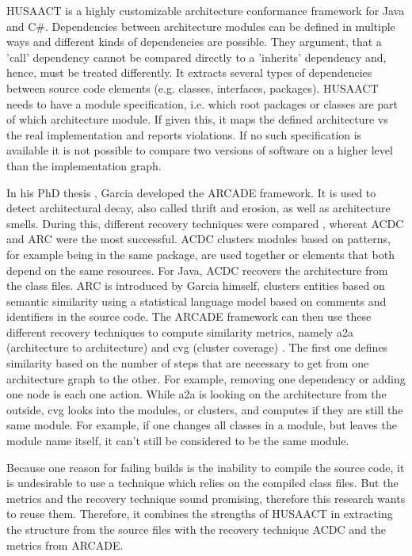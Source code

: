 \documentclass[conference]{IEEEtran}
\begin{document}
HUSAACT \cite{Husacct1,Husacct2} is a highly customizable architecture conformance framework for Java and C\#. Dependencies between architecture modules can be defined in multiple ways and different kinds of dependencies are possible. They argument, that a 'call' dependency cannot be compared directly to a 'inherits' dependency and, hence, must be treated differently. 
It extracts several types of dependencies between source code elements (e.g. classes, interfaces, packages). HUSAACT needs to have a module specification, i.e. which root packages or classes are part of which architecture module. If given this, it maps the defined architecture vs the real implementation and reports violations.
If no such specification is available it is not possible to compare two versions of software on a higher level than the implementation graph. 

In his PhD thesis \cite{arcade-thesis}, Garcia developed the ARCADE framework. It is used to detect architectural decay, also called thrift and erosion, as well as architecture smells. During this, different recovery techniques were compared \cite{arcRec-comparison}, whereat ACDC \cite{ACDC} and ARC were the most successful. 
ACDC clusters modules based on patterns, for example being in the same package, are used together or elements that both depend on the same resources. For Java, ACDC recovers the architecture from the class files. ARC is introduced by Garcia himself, clusters entities based on semantic similarity using a statistical language model based on comments and identifiers in the source code.
The ARCADE framework can then use these different recovery techniques to compute similarity metrics, namely a2a (architecture to architecture) and cvg (cluster coverage) \cite{Arcade}. The first one defines similarity based on the number of steps that are necessary to get from one architecture graph to the other. For example, removing one dependency or adding one node is each one action. While a2a is looking on the architecture from the outside, cvg looks into the modules, or clusters, and computes if they are still the same module. For example, if one changes all classes in a module, but leaves the module name itself, it can't still be considered to be the same module.

Because one reason for failing builds is the inability to compile the source code, it is undesirable to use a technique which relies on the compiled class files. But the metrics and the recovery technique sound promising, therefore this research wants to reuse them. Therefore, it combines the strengths of HUSAACT in extracting the structure from the source files with the recovery technique ACDC and the metrics from ARCADE.
\end{document}
